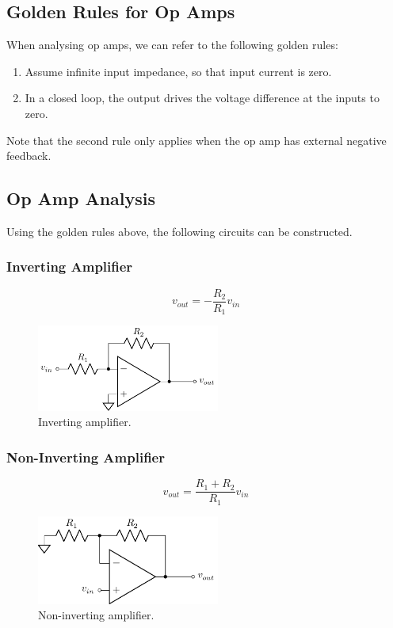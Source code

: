 \documentclass{article}
\begin{document}
\subsection{Golden Rules for Op Amps}
When analysing op amps, we can refer to the following golden rules:
\begin{enumerate}
    \item Assume infinite input impedance, so that input current is zero.
    \item In a closed loop, the output drives the voltage difference at
          the inputs to zero.
\end{enumerate}
Note that the second rule only applies when the op amp has external negative feedback.
\subsection{Op Amp Analysis}
Using the golden rules above, the following circuits can be
constructed.
\subsubsection{Inverting Amplifier}
\begin{equation*}
    v_{out} = -\frac{R_2}{R_1}v_{in}
\end{equation*}
\begin{figure}[H]
    \centering
    \includegraphics[width = 6cm, keepaspectratio = true]{figures/inverting_amplifier.pdf}
    \caption{Inverting amplifier.}
\end{figure}
\subsubsection{Non-Inverting Amplifier}
\begin{equation*}
    v_{out} = \frac{R_1 + R_2}{R_1}v_{in}
\end{equation*}
\begin{figure}[H]
    \centering
    \includegraphics[width = 6cm, keepaspectratio = true]{figures/non_inverting_amplifier.pdf}
    \caption{Non-inverting amplifier.}
\end{figure}
\end{document}
